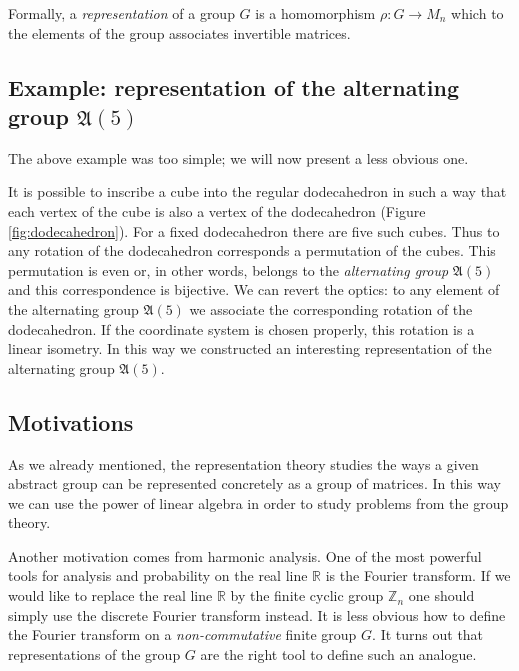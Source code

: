 \documentclass{emsprocart}
\theoremstyle{definition}
\begin{document}
Formally, a \emph{representation} of a group $G$ is a 
homomorphism $\rho: G \rightarrow M_{n}$ which to the elements of the group associates invertible matrices. 

\subsection{Example: representation of the alternating group ${\mathfrak{A}({5})}$}
\label{subsec:dodecahedron}

The above example was too simple; we will now present a less obvious one. 

It is possible to inscribe a cube into the regular dodecahedron in such a way that each vertex of the cube is also a vertex of the dodecahedron (Figure \ref{fig:dodecahedron}). For a fixed dodecahedron there are five such cubes. 
Thus to any rotation of the dodecahedron 
corresponds a permutation of the cubes. This permutation is even 
or, in other words, belongs to the \emph{alternating group} ${\mathfrak{A}({5})}$ and this correspondence is bijective.
We can revert the optics: to any element of the alternating group ${\mathfrak{A}({5})}$  we associate the corresponding rotation of the dodecahedron. If the coordinate system is chosen properly, this rotation is a linear isometry. In this way we constructed an interesting representation of the alternating group ${\mathfrak{A}({5})}$.

\subsection{Motivations}
As we already mentioned, the representation theory studies the ways a given abstract group can be represented concretely as a group of matrices. In this way we can use the power of linear algebra in
order to study problems from the group theory. 

Another motivation comes from harmonic analysis.
One of the most powerful tools for analysis and probability on the real line ${\mathbb{R}}$ is the Fourier transform. 
If we would like to replace the real line ${\mathbb{R}}$ by the finite cyclic group ${\mathbb{Z}}_n$
one should simply use the discrete Fourier transform instead. It is less obvious how to define the
Fourier transform on a \emph{non-commutative} finite group $G$. It turns out that
representations of the group $G$ 
are the right tool to define such an analogue. 
\end{document}
